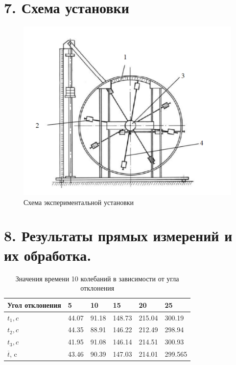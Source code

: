 \documentclass[14pt]{extreport}
\begin{document}
\section*{7. Схема установки}
\begin{figure}[H]
	\begin{center}
		\includegraphics[scale=0.7]{Scheme.png}
		\caption{Схема экспериментальной установки}
		\label{pic}
	\end{center}
\end{figure}

\newpage
\section*{8. Результаты прямых измерений и их обработка.}
\begin{table}[!h]
    \centering
    \begin{tabular}{|l|l|l|l|l|l|}
    \hline
        Угол отклонения & 5 & 10 & 15 & 20 & 25  \\ \hline
        $t_1, c$ & 44.07 & 91.18 & 148.73 & 215.04 & 300.19  \\ \hline
        $t_2, c$ & 44.35 & 88.91 & 146.22 & 212.49 & 298.94  \\ \hline
        $t_3, c$ & 41.95 & 91.08 & 146.14 & 214.51 & 300.93  \\ \hline
        $\overline{t}$, c & 43.46 & 90.39 & 147.03 & 214.01 & 299.565 \\ \hline
    \end{tabular}
    \caption{Значения времени 10 колебаний в зависимости от угла отклонения}
\end{table}
\end{document}
